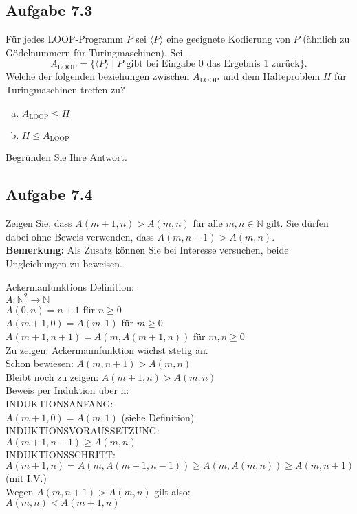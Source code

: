 \subsection*{Aufgabe 7.3}
Für jedes LOOP-Programm $P$ sei $\langle P \rangle$ eine geeignete Kodierung von $P$ (ähnlich zu Gödelnummern für Turingmaschinen). Sei
$$A_{ \text{LOOP} }= \{\langle P \rangle \mid P \text{ gibt bei Eingabe 0 das Ergebnis 1 zurück}\}.$$
Welche der folgenden beziehungen zwischen $A_{\text{LOOP}}$ und dem Halteproblem $H$ für Turingmaschinen treffen zu?
\begin{enumerate}[(a)]
	\item $A_{\text{LOOP}} \leq H$
	\item $H \leq A_{\text{LOOP}}$
\end{enumerate}
Begründen Sie Ihre Antwort.
\subsection*{Aufgabe 7.4}
Zeigen Sie, dass $A(m+1,n) > A(m,n)$ für alle $m,n \in \mathbb{N}$ gilt. Sie dürfen dabei ohne Beweis verwenden, dass $A(m,n+1) > A(m,n)$.\\
\textbf{Bemerkung:} Als Zusatz können Sie bei Interesse versuchen, beide Ungleichungen zu beweisen.

Ackermanfunktions Definition:\\
$A : \mathbb{N}^{2} \rightarrow \mathbb{N}$\\
$A(0,n) = n + 1$ für $n \ge 0$\\
$A(m + 1, 0) = A(m,1)$ für $m \ge 0$\\
$A(m + 1, n + 1) = A(m, A(m + 1, n))$ für $m,n \ge 0$\\

Zu zeigen: Ackermannfunktion wächst stetig an.\\
Schon bewiesen: $A(m, n+1) > A(m,n)$\\
Bleibt noch zu zeigen: $A(m + 1, n) > A(m,n)$\\

Beweis per Induktion über n:\\

INDUKTIONSANFANG:\\
$A(m+1, 0) = A(m,1)$ (siehe Definition)\\

INDUKTIONSVORAUSSETZUNG:\\
$A(m+1, n-1) \ge A(m,n)$\\

INDUKTIONSSCHRITT:\\
$A(m + 1, n) = A(m, A(m + 1, n - 1)) \ge A(m, A(m,n)) \ge A(m, n + 1)$ (mit I.V.)\\

Wegen $A(m, n+1) > A(m,n)$ gilt also:\\
$A(m,n) < A(m + 1,n)$










